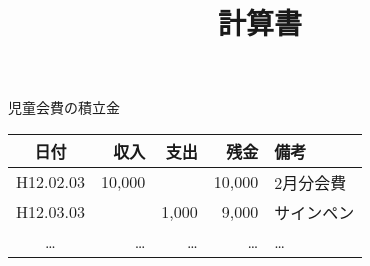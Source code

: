 \documentclass[a4paper,papersize,12pt]{jsarticle}
\begin{document}
\title{計算書}

\maketitle

\sectionZ{}

\noindent
児童会費の積立金


\begin{tabular}{|c|r|r|r|l|}
\hline
日付&収入&支出&残金&備考\\
\hline
H12.02.03&10,000&&10,000&2月分会費\\
H12.03.03&&1,000&9,000&サインペン\\
…&…&…&…&…\\
\hline
\end{tabular}
\end{document}
